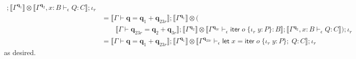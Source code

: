 \documentclass[acmsmall,screen,review]{acmart}
\newcommand{\mb}[1]{\ensuremath{\mathbf{#1}}}
\newcommand{\ms}[1]{\ensuremath{\mathsf{#1}}}
\newcommand{\lto}{:}
\newcommand{\linr}[1]{\iota_r\;{#1}}
\newcommand{\letexpr}[3]{\ensuremath{\ms{let}\;#1 = #2;\;#3}}
\newcommand{\liter}[3]{\ms{iter}\;#1\;\{ \linr{#2} \lto #3 \}}
\newcommand{\qsp}[4]{#1 \vdash #2 = #3 + #4}
\newcommand{\hasty}[4]{#1 \vdash_{#2} #3: {#4}}
\newcommand{\dnt}[1]{\llbracket{#1}\rrbracket}
\begin{document}
\begin{itemize}
\begin{align*}
      ; \dnt{\Gamma^{\mb{q}_1}} \otimes \dnt{\hasty{\Gamma^{\mb{q}_2}, x : B}{\epsilon}{Q}{C}}
      ; \iota_r \\
  &= \dnt{\qsp{\Gamma}{\mb{q}}{\mb{q}_{1}}{\mb{q}_{23r}}}
      ; \dnt{\Gamma^{\mb{q}_1}} \otimes ( \\ & \qquad
        \dnt{\qsp{\Gamma}{\mb{q}_{23r}}{\mb{q}_{2}}{\mb{q}_{3r}}} 
        ; \dnt{\Gamma^{\mb{q}_2}} 
          \otimes \dnt{\hasty{\Gamma^{\mb{q}_{3r}}}{\epsilon}{\liter{o}{y}{P}}{B}}
        ; \dnt{\hasty{\Gamma^{\mb{q}_2}, x : B}{\epsilon}{Q}{C}}
      )
      ; \iota_r\\
  &= \dnt{\qsp{\Gamma}{\mb{q}}{\mb{q}_{1}}{\mb{q}_{23r}}}
      ; \dnt{\Gamma^{\mb{q}_1}} \otimes \dnt{
        \hasty{\Gamma^{\mb{q}_{23r}}}{\epsilon}{\letexpr{x}{\liter{o}{y}{P}}{Q}}{C}
      }
      ; \iota_r
  \end{align*}
  as desired.
\end{itemize}
\end{document}
